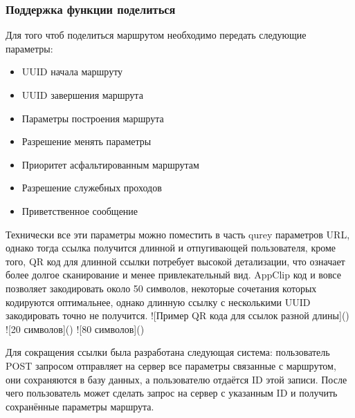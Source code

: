   \subsubsection{Поддержка функции поделиться}
    Для того чтоб поделиться маршрутом необходимо передать следующие параметры:
    \begin{itemize}
      \item UUID начала маршруту
      \item UUID завершения маршрута
      \item Параметры построения маршрута
      \item Разрешение менять параметры
      \item Приоритет асфальтированным маршрутам
      \item Разрешение служебных проходов
      \item Приветственное сообщение
    \end{itemize}

    Технически все эти параметры можно поместить в часть qurey параметров URL, однако тогда ссылка получится длинной и отпугивающей пользователя, кроме того, QR код для длинной ссылки потребует высокой детализации, что означает более долгое сканирование и менее привлекательный вид. AppClip код и вовсе позволяет закодировать около 50 символов, некоторые сочетания которых кодируются оптимальнее, однако длинную ссылку с несколькими UUID закодировать точно не получится.
    ![Пример QR кода для ссылок разной длины]()
    ![20 символов]()
    ![80 символов]()

    Для сокращения ссылки была разработана следующая система: пользователь POST запросом отправляет на сервер все параметры связанные с маршрутом, они сохраняются в базу данных, а пользователю отдаётся ID этой записи. После чего пользователь может сделать запрос на сервер с указанным ID и получить сохранённые параметры маршрута.

